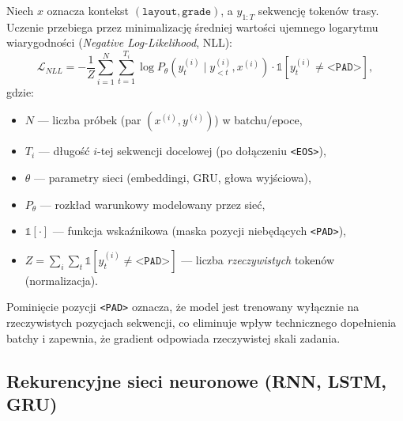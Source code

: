 \documentclass[12pt,a4paper]{article}
\begin{document}
Niech $x$ oznacza kontekst $(\texttt{layout}, \texttt{grade})$, a $y_{1:T}$ sekwencję tokenów trasy. Uczenie przebiega przez minimalizację średniej wartości ujemnego logarytmu wiarygodności (\textit{Negative Log-Likelihood}, NLL):
\begin{equation}
\mathcal{L}_{NLL} = -\frac{1}{Z}\sum_{i=1}^{N}\sum_{t=1}^{T_i}
\log P_\theta\!\left(y_t^{(i)} \mid y_{<t}^{(i)}, x^{(i)}\right)\cdot \mathbb{1}\!\left[y_t^{(i)} \neq \texttt{<PAD>}\right],
\end{equation}
gdzie:
\begin{itemize}[leftmargin=1.5em]
    \item $N$ --- liczba próbek (par $(x^{(i)}, y^{(i)})$) w batchu/epoce,
    \item $T_i$ --- długość $i$-tej sekwencji docelowej (po dołączeniu \texttt{<EOS>}),
    \item $\theta$ --- parametry sieci (embeddingi, GRU, głowa wyjściowa),
    \item $P_\theta$ --- rozkład warunkowy modelowany przez sieć,
    \item $\mathbb{1}[\cdot]$ --- funkcja wskaźnikowa (maska pozycji niebędących \texttt{<PAD>}),
    \item $Z = \sum_i \sum_t \mathbb{1}\!\left[y_t^{(i)} \neq \texttt{<PAD>}\right]$ --- liczba \emph{rzeczywistych} tokenów (normalizacja).
\end{itemize}
Pominięcie pozycji \texttt{<PAD>} oznacza, że model jest trenowany wyłącznie na rzeczywistych pozycjach sekwencji, co eliminuje wpływ technicznego dopełnienia batchy i zapewnia, że gradient odpowiada rzeczywistej skali zadania.

\subsection{Rekurencyjne sieci neuronowe (RNN, LSTM, GRU)}
\label{sec:rnn-gru}
\end{document}
